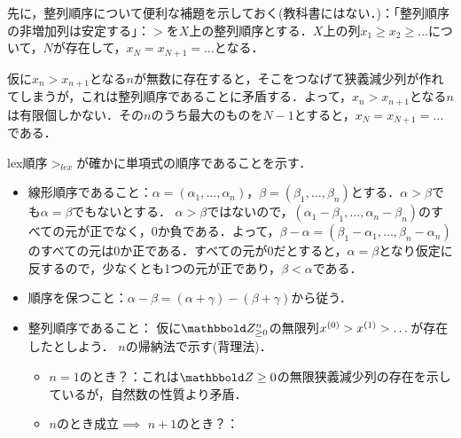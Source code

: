 \documentclass[9pt]{ltjsarticle}
\begin{document}
先に，整列順序について便利な補題を示しておく(教科書にはない．)：「整列順序の非増加列は安定する」：$>$を$X$上の整列順序とする．$X$上の列$x_1\ge x_2 \ge \dots$について，$N$が存在して，$x_N = x_{N+1} = \dots$となる．
\begin{myproof}
 仮に$x_n > x_{n+1}$となる$n$が無数に存在すると，そこをつなげて狭義減少列が作れてしまうが，これは整列順序であることに矛盾する．よって，$x_n > x_{n+1}$となる$n$は有限個しかない．その$n$のうち最大のものを$N-1$とすると，$x_N = x_{N+1} = \dots$である．
\end{myproof}

lex順序$>_{lex}$が確かに単項式の順序であることを示す．
\begin{myproof}
 \begin{itemize}
  \item 線形順序であること：$\alpha = (\alpha_1,\dots,\alpha_n)$，$\beta = (\beta_1,\dots,\beta_n)$とする．$\alpha > \beta$でも$\alpha = \beta$でもないとする．
$\alpha > \beta$ではないので，$(\alpha_1-\beta_1,\dots,\alpha_n-\beta_n)$のすべての元が正でなく，0か負である．よって，$\beta-\alpha = (\beta_1-\alpha_1,\dots,\beta_n-\alpha_n)$のすべての元は0か正である．すべての元が0だとすると，$\alpha = \beta$となり仮定に反するので，少なくとも1つの元が正であり，$\beta < \alpha$である．
  \item 順序を保つこと：$\alpha-\beta = (\alpha+\gamma)-(\beta+\gamma)$から従う．
  \item 整列順序であること：
仮に$\Zge^n$の無限列$x^{(0)}>x^{(1)}>\dots$が存在したとしよう．
$n$の帰納法で示す(背理法)．
\begin{itemize}
 \item $n=1$のとき？：これは$\Z\ge 0$の無限狭義減少列の存在を示しているが，自然数の性質より矛盾．
 \item $n$のとき成立$\implies$ $n+1$のとき？：

\end{itemize}
\end{itemize}
\end{myproof}
\end{document}
